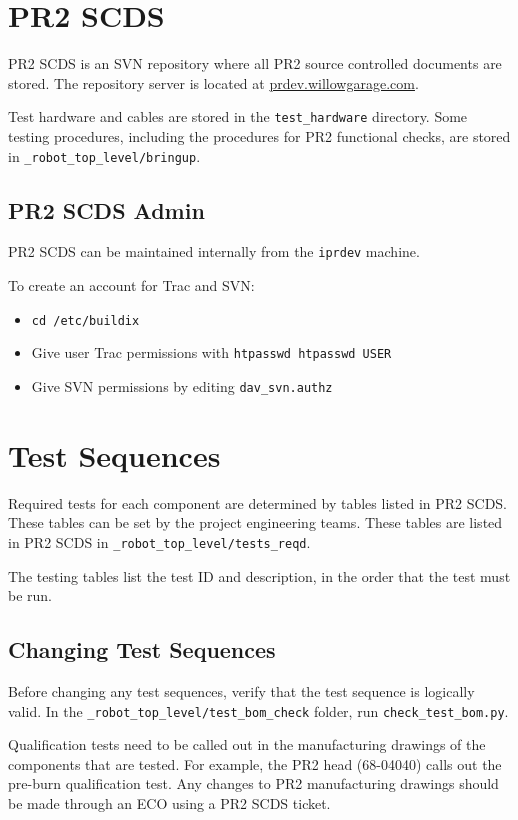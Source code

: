 \documentclass[11pt]{report}
\begin{document}
\section{PR2 SCDS}

PR2 SCDS is an SVN repository where all PR2 source controlled documents are stored. The repository server is located at \href{http://prdev.willowgarage.com}{prdev.willowgarage.com}.

Test hardware and cables are stored in the \texttt{test\_hardware} directory. Some testing procedures, including the procedures for PR2 functional checks, are stored in \texttt{\_robot\_top\_level/bringup}.

\subsection{PR2 SCDS Admin}

PR2 SCDS can be maintained internally from the \texttt{iprdev} machine. 

To create an account for Trac and SVN:
\begin{itemize}
\item \texttt{cd /etc/buildix}
\item Give user Trac permissions with \texttt{htpasswd htpasswd USER}
\item Give SVN permissions by editing \texttt{dav\_svn.authz}
\end{itemize}

\section{Test Sequences}

Required tests for each component are determined by tables listed in PR2 SCDS. These tables can be set by the project engineering teams. These tables are listed in PR2 SCDS in \texttt{\_robot\_top\_level/tests\_reqd}. 

The testing tables list the test ID and description, in the order that the test must be run.

\subsection{Changing Test Sequences}

Before changing any test sequences, verify that the test sequence is logically valid. In the \texttt{\_robot\_top\_level/test\_bom\_check} folder, run \texttt{check\_test\_bom.py}. 

Qualification tests need to be called out in the manufacturing drawings of the components that are tested. For example, the PR2 head (68-04040) calls out the pre-burn qualification test. Any changes to PR2 manufacturing drawings should be made through an ECO using a PR2 SCDS ticket.
\end{document}
